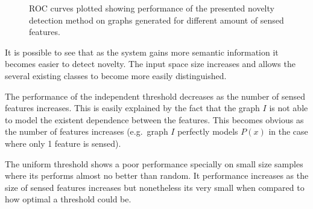 \begin{figure}[h]
\centering

\qquad
{}

\qquad
{}

\caption{\label{fig:synthetic-roc-breakdown}ROC curves plotted showing performance of the
         presented novelty detection method on graphs generated for different amount of
         sensed features.}
\end{figure}

It is possible to see that as the system gains more semantic information it
becomes easier to detect novelty. The input space size increases and allows the
several existing classes to become more easily distinguished.

The performance of the independent threshold decreases as the number of sensed
features increases. This is easily explained by the fact that the graph $I$ is not
able to model the existent dependence between the features. This becomes obvious
as the number of features increases (e.g.\ graph $I$ perfectly models $P(x)$ in the
case where only 1 feature is sensed).

The uniform threshold shows a poor performance specially on small size samples
where its performs almost no better than random.
It performance increases as the size of sensed features increases but nonetheless
its very small when compared to how optimal a threshold could be.

